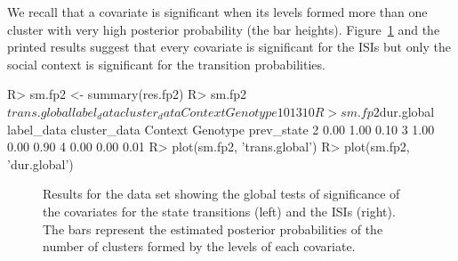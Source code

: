 {We recall that a covariate is significant when its levels formed more than one cluster with very high posterior probability (the bar heights). 
Figure~\ref{fig:global} and the printed results suggest that every covariate is significant for the ISIs but only the social context is significant for the transition probabilities. }


           
\begin{example}
R> sm.fp2 <- summary(res.fp2)
R> sm.fp2$trans.global
            label_data
cluster_data Context Genotype
           1       0        1
           3       1        0
R> sm.fp2$dur.global
            label_data
cluster_data Context Genotype prev_state
           2    0.00     1.00       0.10
           3    1.00     0.00       0.90
           4    0.00     0.00       0.01
R> plot(sm.fp2, 'trans.global')
R> plot(sm.fp2, 'dur.global')
\end{example}


\begin{figure}[!ht]
\centering
{}
\qquad
{}
\caption{Results for the  data set showing the global tests of significance of the covariates for the state transitions (left) and the ISIs (right).
The bars represent the estimated posterior probabilities of the number of clusters formed by the levels of each covariate.}
\label{fig:global}
\end{figure}


